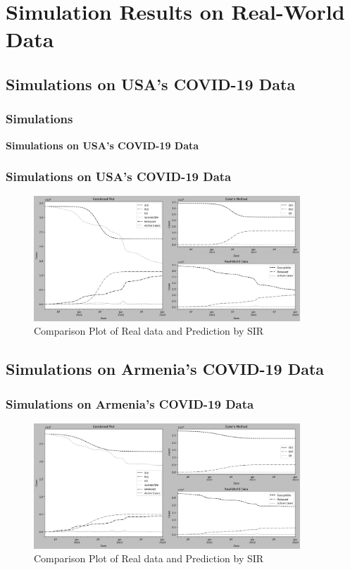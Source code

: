 \documentclass{beamer}
\begin{document}
\section{Simulation Results on Real-World Data}
\subsection{Simulations on USA's COVID-19 Data}
\begin{frame}\frametitle{Simulations}
    \begin{center}
        \textbf{Simulations on USA's COVID-19 Data}
    \end{center}
\end{frame}

\begin{frame}\frametitle{Simulations on USA's COVID-19 Data}
    \begin{figure}
        \caption{Comparison Plot of Real data and Prediction by SIR}
        \centering
        \includegraphics[width=10cm]{Figure_USAPredict.png}
    \end{figure}
\end{frame}

\subsection{Simulations on Armenia's COVID-19 Data}
\begin{frame}\frametitle{Simulations on Armenia's COVID-19 Data}
    \begin{figure}
        \caption{Comparison Plot of Real data and Prediction by SIR}
        \centering
        \includegraphics[width=10cm]{Figure_ArmPredict.png}
    \end{figure}
\end{frame}
\end{document}
